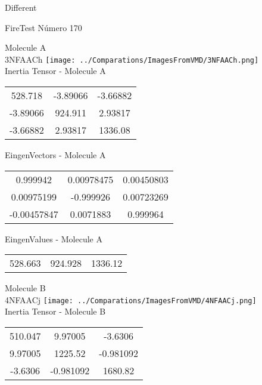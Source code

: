 \begin{center}
\vtab
\vtab
\textcolor{NavyBlue}{\Large Different}
\end{center}

 \newpage

\vtab[-2cm]
\begin{center}
{\large FireTest \tab Número 170}
\end{center}
\begin{multicols}{2}
\begin{center}

Molecule A \\ 
3NFAACh
\texttt{[image: ../Comparations/ImagesFromVMD/3NFAACh.png]}
\\
Inertia Tensor - Molecule A \\
\vtab

\begin{tabular}{|c c c|}
528.718	 & 	-3.89066	 & 	-3.66882	 \\
-3.89066	 & 	924.911	 & 	2.93817	 \\
-3.66882	 & 	2.93817	 & 	1336.08
\end{tabular}

\vtab
 EingenVectors - Molecule A     \\
\vtab
\begin{tabular}{|c c c|}
0.999942	 & 	0.00978475	 & 	0.00450803	 \\
0.00975199	 & 	-0.999926	 & 	0.00723269	 \\
-0.00457847	 & 	0.0071883	 & 	0.999964
\end{tabular}

\vtab
 EingenValues - Molecule A     \\
\vtab
\begin{tabular}{|c c c|}
528.663	 & 	924.928	 & 	1336.12	 \\
\end{tabular}
\columnbreak

Molecule B \\ 
4NFAACj
\texttt{[image: ../Comparations/ImagesFromVMD/4NFAACj.png]}
\\
Inertia Tensor - Molecule B \\
\vtab

\begin{tabular}{|c c c|}
510.047	 & 	9.97005	 & 	-3.6306	 \\
9.97005	 & 	1225.52	 & 	-0.981092	 \\
-3.6306	 & 	-0.981092	 & 	1680.82
\end{tabular}


\end{center}
\end{multicols}
